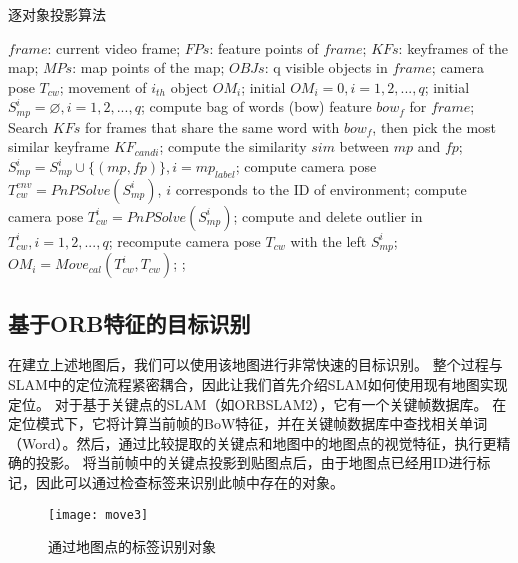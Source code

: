 \begin{algorithm}[htbp]  
	\caption{逐对象投影算法}  
	\label{alg::poa}  
	\begin{algorithmic}[1]  
		\Require  
		$frame$: current video frame;
		$FPs$: feature points of $frame$;  
		$KFs$: keyframes of the map;  
		$MPs$: map points of the map;
		$OBJs$: q visible objects in $frame$;   
		\Ensure  
		camera pose $T_{cw}$;
		movement of $i_{th}$ object $OM_i$;
		\State initial $OM_i=0, i = 1,2,...,q$;
		\State initial $S_{mp}^i=\varnothing, i=1,2,...,q$;
		\State compute bag of words (bow) feature $bow_f$ for $frame$;
		\State Search $KFs$ for frames that share the same word with $bow_f$, then pick the most similar keyframe $KF_{candi}$;
		compute the similarity $sim$ between $mp$ and $fp$;
		\State $S_{mp}^i = S_{mp}^i\cup\{(mp,fp)\}, i = mp_{label}$;
		\EndIf
		\EndFor 
		\EndFor
		\State compute camera pose $T_{cw}^{env} = PnPSolve(S_{mp}^i)$, $i$ corresponds to the ID of environment;
		\State compute camera pose $T_{cw}^{i} = PnPSolve(S_{mp}^i)$;
		\EndFor
		\EndFor
		\State compute and delete outlier in ${T_{cw}^{i}, i=1,2,...,q}$;
		\State recompute camera pose $T_{cw}$ with the left $S_{mp}^i$;
		\State $OM_i = Move_{cal}(T_{cw}^{i}, T_{cw})$; 
		\Else 
		;
		\EndIf
	\end{algorithmic}
\end{algorithm}  

\subsection{基于ORB特征的目标识别}

在建立上述地图后，我们可以使用该地图进行非常快速的目标识别。
整个过程与SLAM中的定位流程紧密耦合，因此让我们首先介绍SLAM如何使用现有地图实现定位。
对于基于关键点的SLAM（如ORBSLAM2），它有一个关键帧数据库。
在定位模式下，它将计算当前帧的BoW特征，并在关键帧数据库中查找相关单词（Word）。然后，通过比较提取的关键点和地图中的地图点的视觉特征，执行更精确的投影。
将当前帧中的关键点投影到贴图点后，由于地图点已经用ID进行标记，因此可以通过检查标签来识别此帧中存在的对象。

\begin{figure}[htbp]
	\centering
	\texttt{[image: move3]}
	\caption{通过地图点的标签识别对象}
	\label{fig:match}
\end{figure}

